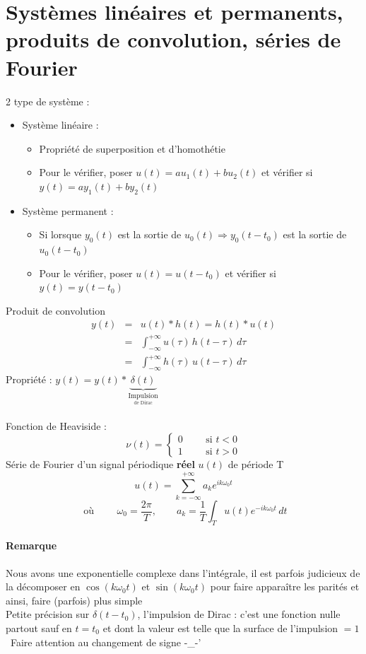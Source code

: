 \section{Systèmes linéaires et permanents, produits de convolution, séries de Fourier}
2 type de système :\begin{itemize}
\item Système linéaire : \begin{itemize}
\item Propriété de superposition et d’homothétie
\item Pour le vérifier, poser $u(t)=au_1(t)+bu_2(t)$ et vérifier si $y(t) = ay_1(t)+by_2(t)$
\end{itemize}
\item Système permanent : \begin{itemize}
\item Si lorsque $y_0(t)$ est la sortie de $u_0(t)\Rightarrow y_0(t-t_0)$ est la sortie de $u_0(t-t_0)$
\item Pour le vérifier, poser $u(t)=u(t-t_0)$ et vérifier si $y(t)=y(t-t_0)$
\end{itemize}
\end{itemize}
Produit de convolution \begin{eqnarray}
y(t) &=& u(t)*h(t)=h(t)*u(t)\\
&=& \int_{-\infty}^{+\infty} u(\tau)\,h(t-\tau)\,d\tau\\
&=& \int_{-\infty}^{+\infty} h(\tau)\,u(t-\tau)\,d\tau
\end{eqnarray}
Propriété : $y(t)=y(t)*\underbrace{\delta(t)}_{\underset{\text{de Dirac}}{\text{Impulsion}}}$\\\\
Fonction de Heaviside : $$\nu(t)=\left\{\begin{array}{l}
0 \qquad \text{ si } t<0\\
1 \qquad \text{ si } t>0
\end{array}\right.$$ 
Série de Fourier d'un signal périodique \textbf{réel} $u(t)$ de période T
$$u(t)=\sum_{k=-\infty}^{+\infty}a_ke^{ik\omega_0t}$$ 
$$\text{ où }\qquad\omega_0=\frac{2\pi}{T},\qquad a_k=\frac{1}{T}\int_Tu(t)e^{-ik\omega_0t}\,dt $$
\paragraph{Remarque} Nous avons une exponentielle complexe dans l'intégrale, il est parfois judicieux de la décomposer en $\cos(k\omega_0t)$ et $\sin(k\omega_0t)$ pour faire apparaître les parités et ainsi, faire (parfois) plus simple\\
Petite précision sur $\delta(t-t_0)$, l'impulsion de Dirac : c'est une fonction nulle partout sauf en $t=t_0$ et dont la valeur est telle que la surface de l'impulsion $=1$\\
\danger\ Faire attention au changement de signe -\_-'
